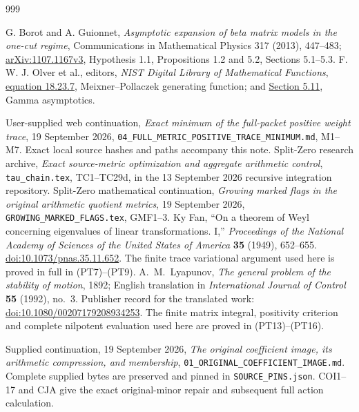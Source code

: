 \begin{thebibliography}{999}

 G. Borot and A. Guionnet,
\emph{Asymptotic expansion of beta matrix models in the one-cut regime},
Communications in Mathematical Physics 317 (2013), 447--483;
\href{https://arxiv.org/abs/1107.1167}{arXiv:1107.1167v3},
Hypothesis 1.1, Propositions 1.2 and 5.2, Sections 5.1--5.3.
 F. W. J. Olver et al., editors,
\emph{NIST Digital Library of Mathematical Functions},
\href{https://dlmf.nist.gov/18.23.E7}{equation 18.23.7},
Meixner--Pollaczek generating function; and
\href{https://dlmf.nist.gov/5.11}{Section 5.11}, Gamma asymptotics.

User-supplied web continuation, \emph{Exact minimum of the full-packet
positive weight trace}, 19 September 2026,
\texttt{04\_FULL\_METRIC\_POSITIVE\_TRACE\_MINIMUM.md}, M1--M7.
Exact local source hashes and paths accompany this note.
Split-Zero research archive, \emph{Exact source-metric optimization and
aggregate arithmetic control}, \texttt{tau\_chain.tex}, TC1--TC29d,
in the 13 September 2026 recursive integration repository.
Split-Zero mathematical continuation, \emph{Growing marked flags in
the original arithmetic quotient metrics}, 19 September 2026,
\texttt{GROWING\_MARKED\_FLAGS.tex}, GMF1--3.
Ky Fan, ``On a theorem of Weyl concerning eigenvalues of linear
transformations. I,'' \emph{Proceedings of the National Academy of
Sciences of the United States of America} \textbf{35} (1949), 652--655.
\href{https://doi.org/10.1073/pnas.35.11.652}{doi:10.1073/pnas.35.11.652}.
The finite trace variational argument used here is proved in full
in (PT7)--(PT9).
A.~M.~Lyapunov, \emph{The general problem of the stability of motion},
1892; English translation in \emph{International Journal of Control}
\textbf{55} (1992), no.~3. Publisher record for the translated work:
\href{https://doi.org/10.1080/00207179208934253}{doi:10.1080/00207179208934253}.
The finite matrix integral, positivity criterion and complete
nilpotent evaluation used here are proved in (PT13)--(PT16).

Supplied continuation, 19 September 2026,
\emph{The original coefficient image, its arithmetic compression,
and membership}, \texttt{01\_ORIGINAL\_COEFFICIENT\_IMAGE.md}.
Complete supplied bytes are preserved and pinned in
\texttt{SOURCE\_PINS.json}. COI1--17 and CJA give the exact
original-minor repair and subsequent full action calculation.


\end{thebibliography}
